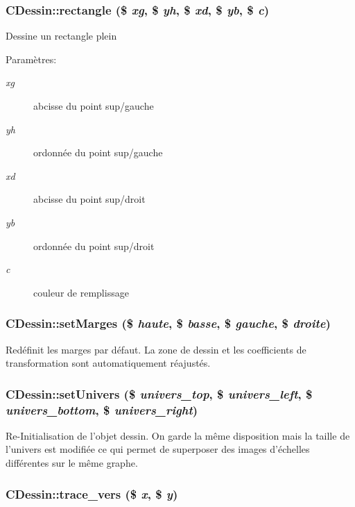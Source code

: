 \hypertarget{classCDessin_a18}{
\subsubsection[rectangle]{\setlength{\rightskip}{0pt plus 5cm}CDessin::rectangle (\$ {\em xg}, \$ {\em yh}, \$ {\em xd}, \$ {\em yb}, \$ {\em c})}}
\label{classCDessin_a18}


Dessine un rectangle plein \begin{Desc}
\item[Param\`{e}tres:]
\begin{description}
\item[{\em xg}]abcisse du point sup/gauche \item[{\em yh}]ordonn\'{e}e du point sup/gauche \item[{\em xd}]abcisse du point sup/droit \item[{\em yb}]ordonn\'{e}e du point sup/droit \item[{\em c}]couleur de remplissage\end{description}
\end{Desc}
\hypertarget{classCDessin_a2}{
\subsubsection[setMarges]{\setlength{\rightskip}{0pt plus 5cm}CDessin::set\-Marges (\$ {\em haute}, \$ {\em basse}, \$ {\em gauche}, \$ {\em droite})}}
\label{classCDessin_a2}


Red\'{e}finit les marges par d\'{e}faut. La zone de dessin et les coefficients de transformation sont automatiquement r\'{e}ajust\'{e}s.\hypertarget{classCDessin_a1}{
\subsubsection[setUnivers]{\setlength{\rightskip}{0pt plus 5cm}CDessin::set\-Univers (\$ {\em univers\_\-top}, \$ {\em univers\_\-left}, \$ {\em univers\_\-bottom}, \$ {\em univers\_\-right})}}
\label{classCDessin_a1}


Re-Initialisation de l'objet dessin. On garde la m\^{e}me disposition mais la taille de l'univers est modifi\'{e}e ce qui permet de superposer des images d'\'{e}chelles diff\'{e}rentes sur le m\^{e}me graphe.\hypertarget{classCDessin_a8}{
\subsubsection[trace\_\-vers]{\setlength{\rightskip}{0pt plus 5cm}CDessin::trace\_\-vers (\$ {\em x}, \$ {\em y})}}
\label{classCDessin_a8}


